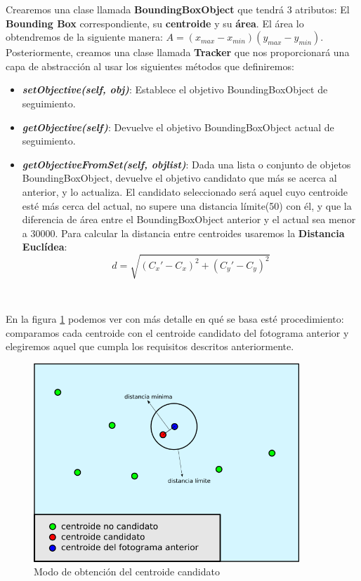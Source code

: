Crearemos una clase llamada \textbf{BoundingBoxObject} que tendrá 3 atributos: El \textbf{Bounding Box} correspondiente, su \textbf{centroide} y su \textbf{área}. El área lo obtendremos de la siguiente manera: $A = (x_{max} - x_{min}) (y_{max} - y_{min})$.\\

Posteriormente, creamos una clase llamada \textbf{Tracker} que nos proporcionará una capa de abstracción al usar los siguientes métodos que definiremos:

\begin{itemize}
	\item \textbf{\textit{setObjective(self, obj)}}: Establece el objetivo BoundingBoxObject de seguimiento.
	\item \textbf{\textit{getObjective(self)}}: Devuelve el objetivo BoundingBoxObject actual de seguimiento.
	\item \textbf{\textit{getObjectiveFromSet(self, objlist)}}: Dada una lista o conjunto de objetos BoundingBoxObject, devuelve el objetivo candidato que más se acerca al anterior, y lo actualiza. El candidato seleccionado será aquel cuyo centroide esté más cerca del actual, no supere una distancia límite(50) con él, y que la diferencia de área entre el BoundingBoxObject anterior y el actual sea menor a 30000. Para calcular la distancia entre centroides usaremos la \textbf{Distancia Euclídea}:
	\begin{equation*}
	d = \sqrt{(C_{x}' - C_{x})^2 + (C_{y}' - C_{y})^2}
	\end{equation*}
\end{itemize}\

En la figura \ref{fig:obtencion_centroide} podemos ver con más detalle en qué se basa esté procedimiento: comparamos cada centroide con el centroide candidato del fotograma anterior y elegiremos aquel que cumpla los requisitos descritos anteriormente.\\

\begin{figure} [H]
  \begin{center}
    \includegraphics[width=10cm]{imagenes/esquema-tracker.png}
  \end{center}
  \caption[Modo de obtención del centroide candidato]{Modo de obtención del centroide candidato}
  \label{fig:obtencion_centroide}
\end{figure}\

